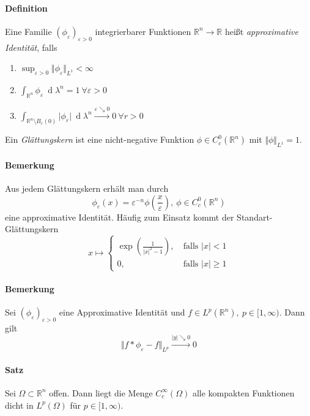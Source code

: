 \documentclass[12pt,a4paper,fleqn]{article}
\def\d{{\operatorname{d}}}
\begin{document}
\paragraph{Definition} Eine Familie $(\phi_\varepsilon)_{\varepsilon > 0}$ integrierbarer Funktionen $\mathbb{R}^n \rightarrow \mathbb{R}$ heißt \textit{approximative Identität}, falls 
\begin{enumerate}
\item $\sup_{\varepsilon > 0} \Vert \phi_\varepsilon \Vert _{L^1}  < \infty$
\item $\int_{\mathbb{R}^n} \phi_\varepsilon\ \d\lambda^n = 1\ \forall\varepsilon>0$
\item$\int_{\mathbb{R}^n\setminus B_r(0)} \vert \phi_\varepsilon\vert\ \d\lambda^n \xrightarrow{\varepsilon\searrow 0} 0\ \forall r > 0$ 
\end{enumerate}
Ein \textit{Glättungskern} ist eine nicht-negative Funktion $\phi \in C^0_c(\mathbb{R}^n)$ mit $\Vert \phi \Vert_{L^1} = 1$.

\paragraph{Bemerkung} Aus jedem Glättungskern erhält man durch
\begin{displaymath}
\phi_\varepsilon(x) = \varepsilon^{-n} \phi\left(\frac{x}{\varepsilon}\right),\ \phi \in C^0_c (\mathbb{R}^n)
\end{displaymath}
eine approximative Identität. Häufig zum Einsatz kommt der Standart-Glättungskern
\begin{displaymath}
x \mapsto \begin{cases}
 \exp \left(\frac{1}{\vert x \vert ^2- 1}\right),&\ \text{falls } \vert x \vert < 1 \\ 0,&\ \text{falls } \vert x \vert \geq 1
\end{cases}
\end{displaymath}

\paragraph{Bemerkung} Sei $(\phi_\varepsilon)_{\varepsilon > 0}$ eine Approximative Identität und $f \in L^p(\mathbb{R}^n),\ p \in [1, \infty)$. Dann gilt 
\begin{displaymath}
\Vert f * \phi_\varepsilon -f\Vert_{L^p } \xrightarrow{\vert y \vert \searrow 0} 0 
\end{displaymath}

\paragraph{Satz} Sei $\Omega \subset \mathbb{R}^n$ offen. Dann liegt die Menge $C^\infty_c (\Omega)$ alle kompakten Funktionen dicht in $L^p(\Omega)$ für $p \in [1, \infty)$.
\end{document}

